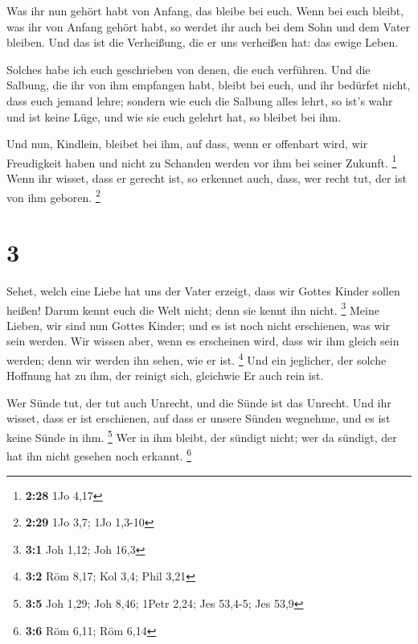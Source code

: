  Was ihr nun gehört habt von Anfang, das bleibe bei euch.
Wenn bei euch bleibt, was ihr von Anfang gehört habt, so werdet ihr auch
bei dem Sohn und dem Vater bleiben.  Und das ist die
Verheißung, die er uns verheißen hat: das ewige Leben.

 Solches habe ich euch geschrieben von denen, die euch
verführen.  Und die Salbung, die ihr von ihm empfangen
habt, bleibt bei euch, und ihr bedürfet nicht, dass euch jemand lehre;
sondern wie euch die Salbung alles lehrt, so ist's wahr und ist keine
Lüge, und wie sie euch gelehrt hat, so bleibet bei ihm.

 Und nun, Kindlein, bleibet bei ihm, auf dass, wenn er
offenbart wird, wir Freudigkeit haben und nicht zu Schanden werden vor
ihm bei seiner Zukunft. \footnote{\textbf{2:28} 1Jo 4,17} 
Wenn ihr wisset, dass er gerecht ist, so erkennet auch, dass, wer recht
tut, der ist von ihm geboren. \footnote{\textbf{2:29} 1Jo 3,7; 1Jo
  1,3-10}

\hypertarget{section-2}{%
\section{3}\label{section-2}}

 Sehet, welch eine Liebe hat uns der Vater erzeigt, dass wir
Gottes Kinder sollen heißen! Darum kennt euch die Welt nicht; denn sie
kennt ihn nicht. \footnote{\textbf{3:1} Joh 1,12; Joh 16,3} 
Meine Lieben, wir sind nun Gottes Kinder; und es ist noch nicht
erschienen, was wir sein werden. Wir wissen aber, wenn es erscheinen
wird, dass wir ihm gleich sein werden; denn wir werden ihn sehen, wie er
ist. \footnote{\textbf{3:2} Röm 8,17; Kol 3,4; Phil 3,21} 
Und ein jeglicher, der solche Hoffnung hat zu ihm, der reinigt sich,
gleichwie Er auch rein ist.

 Wer Sünde tut, der tut auch Unrecht, und die Sünde ist das
Unrecht.  Und ihr wisset, dass er ist erschienen, auf dass
er unsere Sünden wegnehme, und es ist keine Sünde in ihm. \footnote{\textbf{3:5}
  Joh 1,29; Joh 8,46; 1Petr 2,24; Jes 53,4-5; Jes 53,9}  Wer
in ihm bleibt, der sündigt nicht; wer da sündigt, der hat ihn nicht
gesehen noch erkannt. \footnote{\textbf{3:6} Röm 6,11; Röm 6,14}


